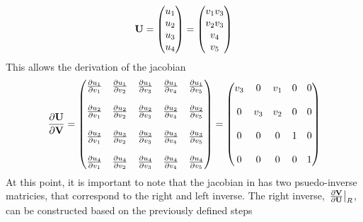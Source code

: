 \begin{equation}
  \mathbf U = \begin{pmatrix}
    u_1 \\
    u_2 \\
    u_3 \\
    u_4
  \end{pmatrix}
  =
  \begin{pmatrix}
    v_1 v_3 \\
    v_2 v_3 \\
    v_4 \\
    v_5
  \end{pmatrix}
  \label{u-to-v}
\end{equation}
This allows the derivation of the jacobian 
\begin{equation}
  \frac{\partial \mathbf U}{\partial \mathbf V} = 
  \begin{pmatrix}
    \frac{\partial u_1}{\partial v_1} & \frac{\partial u_1}{\partial v_2} & \frac{\partial u_1}{\partial v_3} & \frac{\partial u_1}{\partial v_4} & \frac{\partial u_1}{\partial v_5} \\ \\
    \frac{\partial u_2}{\partial v_1} & \frac{\partial u_2}{\partial v_2} & \frac{\partial u_2}{\partial v_3} & \frac{\partial u_2}{\partial v_4} & \frac{\partial u_2}{\partial v_5} \\ \\
    \frac{\partial u_3}{\partial v_1} & \frac{\partial u_3}{\partial v_2} & \frac{\partial u_3}{\partial v_3} & \frac{\partial u_3}{\partial v_4} & \frac{\partial u_3}{\partial v_5} \\ \\
    \frac{\partial u_4}{\partial v_1} & \frac{\partial u_4}{\partial v_2} & \frac{\partial u_4}{\partial v_3} & \frac{\partial u_4}{\partial v_4} & \frac{\partial u_4}{\partial v_5}
  \end{pmatrix}
  =
  \begin{pmatrix}
    v_3 & 0   & v_1 & 0 & 0 \\ \\
    0   & v_3 & v_2 & 0 & 0 \\ \\
    0   & 0   & 0   & 1 & 0 \\ \\
    0   & 0   & 0   & 0 & 1
  \end{pmatrix}
  \label{dudv-jac}
\end{equation}
At this point, it is important to note that the jacobian in  has
two psuedo-inverse matricies, that correspond to the right and left inverse.
The right inverse, $\left. \frac{\partial \mathbf V}{\partial \mathbf U}\right|_{R}$, can be constructed based on the previously
defined steps
